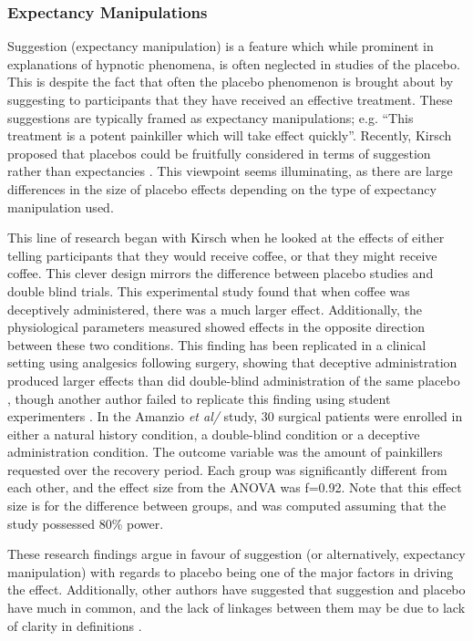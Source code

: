 \subsubsection{Expectancy Manipulations}
\label{sec:suggestion}

Suggestion (expectancy manipulation) is a feature which while prominent in explanations of hypnotic phenomena, is often neglected in studies of the placebo. This is despite the fact that often the placebo phenomenon is brought about by suggesting to participants that they have received an effective treatment. These suggestions are typically framed as expectancy manipulations; e.g. ``This treatment is a potent painkiller which will take effect quickly''. Recently, Kirsch proposed that placebos could be fruitfully considered in terms of suggestion rather than expectancies  \cite{Kirsch1999}. This viewpoint seems illuminating, as there are large differences in the size of placebo effects depending on the type of expectancy manipulation used. 

This line of research began with Kirsch \cite{kirsch1988double} when he looked at the effects of either telling participants that they would receive coffee, or that they might receive coffee. This clever design  mirrors the difference between placebo studies and double blind trials. This experimental study found that when coffee was deceptively administered, there was a much larger effect. Additionally, the physiological parameters measured showed effects in the opposite direction between these two conditions.  This finding has been replicated in a clinical setting using analgesics following surgery, showing that deceptive administration produced larger effects than did double-blind administration of the same placebo \cite{Amanzio2001}, though another author failed to replicate this finding using student experimenters \cite{Walach2002}. In the Amanzio {\it et al/} study, 30 surgical patients were enrolled in either a natural history condition, a double-blind condition or a deceptive administration condition. The outcome variable was the amount of painkillers requested over the recovery period. Each group was significantly different from each other, and the effect size from the ANOVA was f=0.92. Note that this effect size is for the difference between groups, and was computed assuming that the study possessed 80\% power. 

 These research findings argue in favour of  suggestion (or alternatively, expectancy manipulation) with regards to placebo being one of the major factors in driving the effect. Additionally, other authors have suggested that suggestion and placebo have much in common, and the lack of linkages between them may be due to lack of clarity in definitions \cite{DePascalis2002}. 

